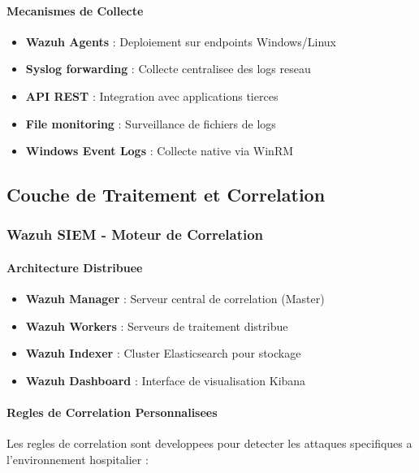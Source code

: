 \paragraph{Mecanismes de Collecte}
\begin{itemize}
    \item \textbf{Wazuh Agents} : Deploiement sur endpoints Windows/Linux
    \item \textbf{Syslog forwarding} : Collecte centralisee des logs reseau
    \item \textbf{API REST} : Integration avec applications tierces
    \item \textbf{File monitoring} : Surveillance de fichiers de logs
    \item \textbf{Windows Event Logs} : Collecte native via WinRM
\end{itemize}

\subsection{Couche de Traitement et Correlation}

\subsubsection{Wazuh SIEM - Moteur de Correlation}

\paragraph{Architecture Distribuee}
\begin{itemize}
    \item \textbf{Wazuh Manager} : Serveur central de correlation (Master)
    \item \textbf{Wazuh Workers} : Serveurs de traitement distribue
    \item \textbf{Wazuh Indexer} : Cluster Elasticsearch pour stockage
    \item \textbf{Wazuh Dashboard} : Interface de visualisation Kibana
\end{itemize}

\paragraph{Regles de Correlation Personnalisees}

Les regles de correlation sont developpees pour detecter les attaques specifiques a l'environnement hospitalier :

